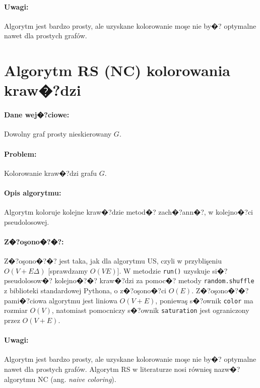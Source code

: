 \documentclass[12pt,a4paper]{mwrep}
\begin{document}
\paragraph{Uwagi:} Algorytm jest bardzo prosty, ale uzyskane
kolorowanie moşe nie by�? optymalne nawet dla prostych grafów.




\section{Algorytm RS (NC) kolorowania kraw�?dzi}
\label{sec:kolorowanie_krawedzi_rs}

\paragraph{Dane wej�?ciowe:} Dowolny graf prosty nieskierowany $G$.

\paragraph{Problem:} Kolorowanie kraw�?dzi grafu $G$.

\paragraph{Opis algorytmu:} Algorytm koloruje kolejne kraw�?dzie
metod�? zach�?ann�?, w kolejno�?ci pseudolosowej.

\paragraph{Z�?oşono�?�?:} Z�?oşono�?�? jest taka, jak dla algorytmu US,
czyli w przyblişeniu $O(V+E\Delta)$ [sprawdzamy $O(V E)$].
W metodzie \lstinline|run()| uzyskuje si�? pseudolosow�? kolejno�?�?
kraw�?dzi za pomoc�? metody \lstinline|random.shuffle|
z biblioteki standardowej Pythona, o z�?oşono�?ci $O(E)$.
Z�?oşono�?�? pami�?ciowa algorytmu jest liniowa $O(V+E)$,
poniewaş s�?ownik \lstinline|color| ma rozmiar $O(V)$, natomiast 
pomocniczy s�?ownik \lstinline|saturation| jest ograniczony przez $O(V+E)$.

\paragraph{Uwagi:} Algorytm jest bardzo prosty, ale uzyskane
kolorowanie moşe nie by�? optymalne nawet dla prostych grafów.
Algorytm RS w literaturze nosi równieş nazw�? algorytmu NC
(ang. \emph{naive coloring}).
\end{document}
